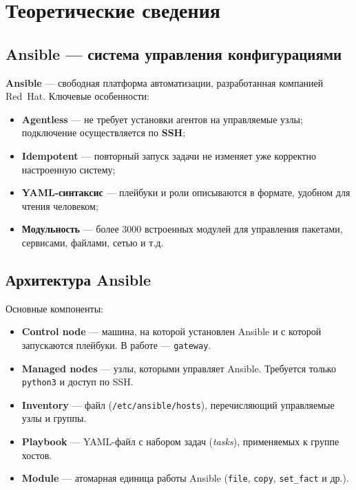 \chapter{Теоретические сведения}
\label{ch:theory}

\section{Ansible — система управления конфигурациями}

\textbf{Ansible} — свободная платформа автоматизации, разработанная компанией
Red~Hat. Ключевые особенности:
\begin{itemize}
  \item \textbf{Agentless} — не требует установки агентов на управляемые узлы;
        подключение осуществляется по \textbf{SSH};
  \item \textbf{Idempotent} — повторный запуск задачи не изменяет уже корректно
        настроенную систему;
  \item \textbf{YAML-синтаксис} — плейбуки и роли описываются в формате,
        удобном для чтения человеком;
  \item \textbf{Модульность} — более 3000 встроенных модулей для управления
        пакетами, сервисами, файлами, сетью и т.д.
\end{itemize}

\section{Архитектура Ansible}

Основные компоненты:
\begin{itemize}
  \item \textbf{Control node} — машина, на которой установлен Ansible
        и с которой запускаются плейбуки. В работе — \texttt{gateway}.
  \item \textbf{Managed nodes} — узлы, которыми управляет Ansible.
        Требуется только \texttt{python3} и доступ по SSH.
  \item \textbf{Inventory} — файл (\texttt{/etc/ansible/hosts}),
        перечисляющий управляемые узлы и группы.
  \item \textbf{Playbook} — YAML-файл с набором задач (\textit{tasks}),
        применяемых к группе хостов.
  \item \textbf{Module} — атомарная единица работы Ansible
        (\texttt{file}, \texttt{copy}, \texttt{set\_fact} и др.).
\end{itemize}

